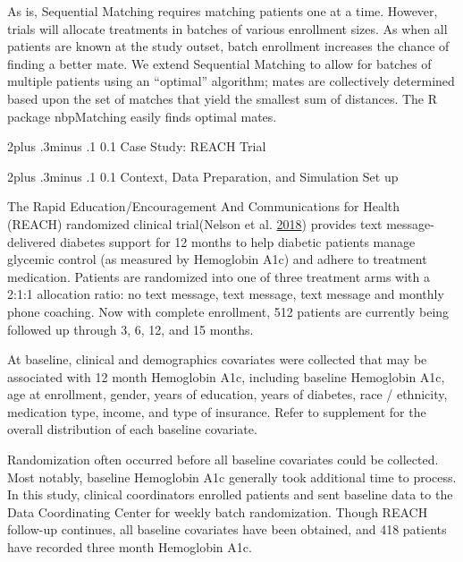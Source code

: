 \documentclass[12pt,oneside]{book}
\makeatletter
\newlength{\li}\setlength{\li}{14.48pt}
\newlength{\di}\setlength{\di}{-3.5mm}
\renewcommand\section{ \@startsection {section}{1}{\z@}%
    {2\@bls  plus .3\@bls minus .1\@bls}%
    {0.1\@bls}%
    {\centering\normalfont}}
\renewcommand\subsection{\@startsection {subsection}{2}{\z@}%
    {2\@bls  plus .3\@bls minus .1\@bls}%
    {0.1\@bls}%
    {\noindent\normalfont}}
\theoremstyle{definition}
\theoremstyle{definition}
\theoremstyle{definition}
\theoremstyle{remark}
\makeatother
\begin{document}
As is, Sequential Matching requires matching patients one at a time.
However, trials will allocate treatments in batches of various
enrollment sizes. As when all patients are known at the study outset,
batch enrollment increases the chance of finding a better mate. We
extend Sequential Matching to allow for batches of multiple patients
using an ``optimal'' algorithm; mates are collectively determined based
upon the set of matches that yield the smallest sum of distances. The R
package nbpMatching easily finds optimal mates.

\hypertarget{case-study-reach-trial}{%
\section{Case Study: REACH Trial}\label{case-study-reach-trial}}

\hypertarget{context-data-preparation-and-simulation-set-up}{%
\subsection{Context, Data Preparation, and Simulation Set
up}\label{context-data-preparation-and-simulation-set-up}}

The Rapid Education/Encouragement And Communications for Health (REACH)
randomized clinical trial(Nelson et al.
\protect\hyperlink{ref-Nelson:2018bw}{2018}) provides text
message-delivered diabetes support for 12 months to help diabetic
patients manage glycemic control (as measured by Hemoglobin A1c) and
adhere to treatment medication. Patients are randomized into one of
three treatment arms with a 2:1:1 allocation ratio: no text message,
text message, text message and monthly phone coaching. Now with complete
enrollment, 512 patients are currently being followed up through 3, 6,
12, and 15 months.

At baseline, clinical and demographics covariates were collected that
may be associated with 12 month Hemoglobin A1c, including baseline
Hemoglobin A1c, age at enrollment, gender, years of education, years of
diabetes, race / ethnicity, medication type, income, and type of
insurance. Refer to supplement for the overall distribution of each
baseline covariate.

Randomization often occurred before all baseline covariates could be
collected. Most notably, baseline Hemoglobin A1c generally took
additional time to process. In this study, clinical coordinators
enrolled patients and sent baseline data to the Data Coordinating Center
for weekly batch randomization. Though REACH follow-up continues, all
baseline covariates have been obtained, and 418 patients have recorded
three month Hemoglobin A1c.
\end{document}
